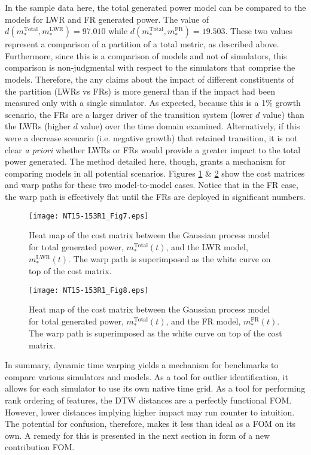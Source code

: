 \documentclass{ntmanuscript}
\newcommand{\LWR}{\mathrm{LWR}}
\newcommand{\FR}{\mathrm{FR}}
\newcommand{\Total}{\mathrm{Total}}
\begin{document}
In the sample data here, the total generated power model can be compared to
the models for LWR and FR generated power. The value of
$d(m_*^\Total, m_*^\LWR) = 97.010$ while $d(m_*^\Total, m_*^\FR) = 19.503$.
These two values represent a comparison of a partition of a total metric,
as described above.  Furthermore, since this is a comparison of models and not
of simulators, this comparison is non-judgmental with respect to the
simulators that comprise the models. Therefore, the any claims about the
impact of different constituents of the partition (LWRs vs FRs) is more general
than if the impact had been measured only with a single simulator.
As expected, because this is a 1\% growth scenario, the FRs are a larger
driver of the transition system (lower $d$ value) than the
LWRs (higher $d$ value) over the time domain examined. Alternatively, if this
were a decrease scenario (i.e. negative growth)
that retained transition, it is not clear \emph{a priori} whether LWRs or FRs would
provide a greater impact to the total power generated. The method detailed
here, though, grants a mechanism for comparing models in all potential
scenarios. Figures
\ref{cost-total-model-to-lwr-model} \& \ref{cost-total-model-to-fr-model}
show the cost matrices and warp paths for these two model-to-model cases.
Notice that in the
FR case, the warp path is effectively flat until the FRs are deployed in
significant numbers.

\begin{figure}[htb]
\centering
\texttt{[image: NT15-153R1\_Fig7.eps]}
\caption{Heat map of the cost matrix between the Gaussian process model
for total generated power, $m_*^\Total(t)$, and the LWR model,
$m_*^\LWR(t)$.
The warp path is superimposed as the white curve on top of the cost matrix.}
\label{cost-total-model-to-lwr-model}
\end{figure}

\begin{figure}[htb]
\centering
\texttt{[image: NT15-153R1\_Fig8.eps]}
\caption{Heat map of the cost matrix between the Gaussian process model
for total generated power, $m_*^\Total(t)$, and the FR model,
$m_*^\FR(t)$.
The warp path is superimposed as the white curve on top of the cost matrix.}
\label{cost-total-model-to-fr-model}
\end{figure}

In summary, dynamic time warping yields a mechanism for benchmarks to
compare various simulators and models. As a tool for
outlier identification, it allows for each simulator to use its own native
time grid. As a tool for performing rank ordering of features, the DTW distances
are a perfectly functional FOM. However, lower distances implying higher
impact may run counter to intuition. The potential for confusion, therefore,
makes it less than ideal as a FOM on its own. A remedy for this is presented
in the next section in form of a new contribution FOM.
\end{document}
